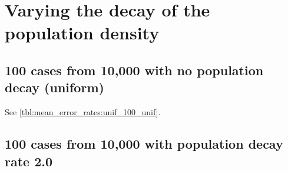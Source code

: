 \section{Varying the decay of the population density}

\subsection{100 cases from 10,000 with no population decay (uniform)}

See \autoref{tbl:mean_error_rates:unif_100_unif}.

\begin{table}[H]
\centering
\scriptsize

    \begin{subtable}{0.5\textwidth}
    
    \caption{Means} 
    \end{subtable}%
    \begin{subtable}{0.5\textwidth}
    
    \caption{Standard deviations} 
    \end{subtable}

\caption{Error rates for uniform population of 10,000, single peak intensity of factor 100 and no population decay (uniform)}
\label{tbl:mean_error_rates:unif_100_unif:3}
\end{table}

\subsection{100 cases from 10,000 with population decay rate 2.0}
\begin{table}[H]
\centering
\scriptsize

    \begin{subtable}{0.5\textwidth}
    
    \caption{Means} 
    \end{subtable}%
    \begin{subtable}{0.5\textwidth}
    
    \caption{Standard deviations} 
    \end{subtable}

\caption{Error rates for uniform population of 10,000, single peak intensity of factor 100 and decay rate 2.0}
\label{tbl:mean_error_rates:p2.0_100_1_1h}
\end{table}

